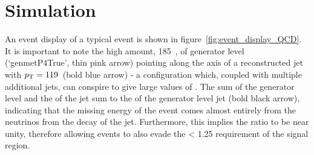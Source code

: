 
\section{Simulation}
An event display of a typical event is shown in figure~\ref{fig:event_display_QCD}.
It is important to note the high amount, 185~\gev, of generator level
\met (`genmetP4True', thin pink arrow) pointing along the axis of a reconstructed
jet with ${p_{\text T}} = 119$~\gev (bold blue arrow) - a configuration which,
coupled with multiple additional jets, can conspire to give
large values of \alphat. The sum of the generator level \met and
the \Pt of the jet sum to the \Pt of the generator level jet (bold black arrow),
indicating that the missing energy of the event comes almost entirely from the
neutrinos from the decay of the jet. Furthermore, this implies the ratio
\mhtmet to be near unity, therefore allowing events to also evade the \mhtmet <
1.25 requirement of the signal region.




